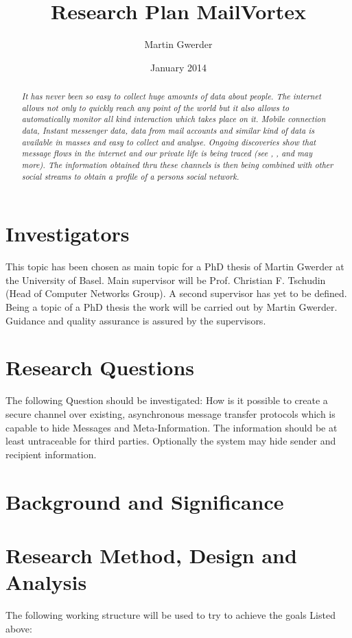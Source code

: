 \documentclass[twocolumn,a4paper]{article}
\begin{document}
\title{Research Plan MailVortex}
\author{Martin Gwerder}
\date{January 2014}
\maketitle

\begin{abstract}\emph{
It has never been so easy  to collect huge amounts of data about people. The internet allows not only to quickly reach any point of the world but it also allows to automatically monitor all kind interaction which takes place on it. Mobile connection data, Instant messenger data, data from mail accounts and similar kind of data is available in masses and easy to collect and analyse. Ongoing discoveries show that message flows in the internet and our private life is being traced (see \cite{echelon}, \cite{prism}, \cite{tempora} and may more). The information obtained thru these channels is then being combined with other social streams to obtain a profile of a persons social network.
}\end{abstract}

\section{Investigators}
This topic has been chosen as main topic for a PhD thesis of Martin Gwerder at the University of Basel. Main supervisor will be Prof. Christian F. Tschudin (Head of Computer Networks Group). A second supervisor has yet to be defined. Being a topic of a PhD thesis the work will be carried out by Martin Gwerder. Guidance and quality assurance is assured by the supervisors.

\section{Research Questions}
The following Question should be investigated: How is it possible to create a secure channel over existing, asynchronous message transfer protocols which is capable to hide Messages and Meta-Information. The information should be at least untraceable for third parties. Optionally the system may hide sender and recipient information.

\section{Background and Significance}

\section{Research Method, Design and Analysis}
The following working structure will be used to try to achieve the goals Listed above:\par
\end{document}
